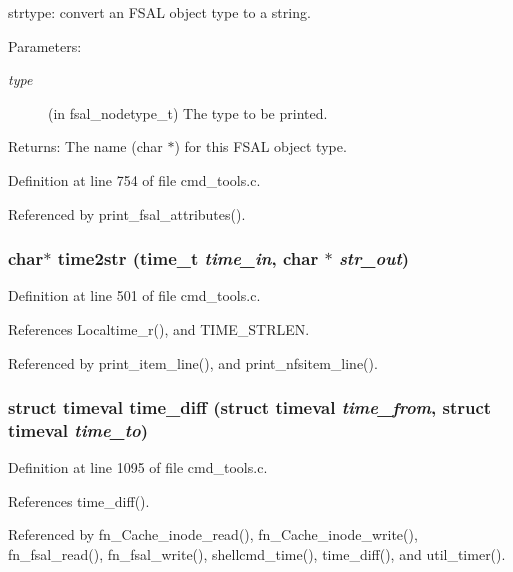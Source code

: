 strtype: convert an FSAL object type to a string.

\begin{Desc}
\item[Parameters:]
\begin{description}
\item[{\em type}](in fsal\_\-nodetype\_\-t) The type to be printed. \end{description}
\end{Desc}
\begin{Desc}
\item[Returns:]The name (char $\ast$) for this FSAL object type. \end{Desc}


Definition at line 754 of file cmd\_\-tools.c.

Referenced by print\_\-fsal\_\-attributes().
\subsubsection{\setlength{\rightskip}{0pt plus 5cm}char$\ast$ time2str (time\_\-t {\em time\_\-in}, char $\ast$ {\em str\_\-out})}\label{cmd__tools_8c_a11}




Definition at line 501 of file cmd\_\-tools.c.

References Localtime\_\-r(), and TIME\_\-STRLEN.

Referenced by print\_\-item\_\-line(), and print\_\-nfsitem\_\-line().
\subsubsection{\setlength{\rightskip}{0pt plus 5cm}struct timeval time\_\-diff (struct timeval {\em time\_\-from}, struct timeval {\em time\_\-to})}\label{cmd__tools_8c_a19}




Definition at line 1095 of file cmd\_\-tools.c.

References time\_\-diff().

Referenced by fn\_\-Cache\_\-inode\_\-read(), fn\_\-Cache\_\-inode\_\-write(), fn\_\-fsal\_\-read(), fn\_\-fsal\_\-write(), shellcmd\_\-time(), time\_\-diff(), and util\_\-timer().